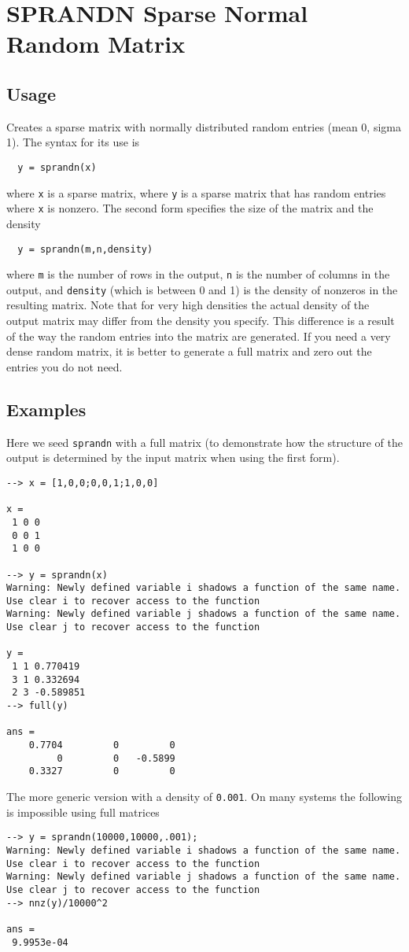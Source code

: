 \section{SPRANDN Sparse Normal Random Matrix}

\subsection{Usage}

Creates a sparse matrix with normally distributed random entries (mean 0, sigma 1).  The
syntax for its use is
\begin{verbatim}
  y = sprandn(x)
\end{verbatim}
where \verb|x| is a sparse matrix, where \verb|y| is a sparse matrix that has
random entries where \verb|x| is nonzero.  The second form specifies the
size of the matrix and the density
\begin{verbatim}
  y = sprandn(m,n,density)
\end{verbatim}
where \verb|m| is the number of rows in the output, \verb|n| is the number of 
columns in the output, and \verb|density| (which is between 0 and 1) is
the density of nonzeros in the resulting matrix.  Note that for very
high densities the actual density of the output matrix may differ from
the density you specify.  This difference is a result of the way the
random entries into the matrix are generated.  If you need a very dense
random matrix, it is better to generate a full matrix and zero out the 
entries you do not need.
\subsection{Examples}

Here we seed \verb|sprandn| with a full matrix (to demonstrate how the structure
of the output is determined by the input matrix when using the first form).
\begin{verbatim}
--> x = [1,0,0;0,0,1;1,0,0]

x = 
 1 0 0 
 0 0 1 
 1 0 0 

--> y = sprandn(x)
Warning: Newly defined variable i shadows a function of the same name.  Use clear i to recover access to the function
Warning: Newly defined variable j shadows a function of the same name.  Use clear j to recover access to the function

y = 
 1 1 0.770419
 3 1 0.332694
 2 3 -0.589851
--> full(y)

ans = 
    0.7704         0         0 
         0         0   -0.5899 
    0.3327         0         0 
\end{verbatim}
The more generic version with a density of \verb|0.001|.  On many systems the
following is impossible using full matrices
\begin{verbatim}
--> y = sprandn(10000,10000,.001);
Warning: Newly defined variable i shadows a function of the same name.  Use clear i to recover access to the function
Warning: Newly defined variable j shadows a function of the same name.  Use clear j to recover access to the function
--> nnz(y)/10000^2

ans = 
 9.9953e-04 
\end{verbatim}
